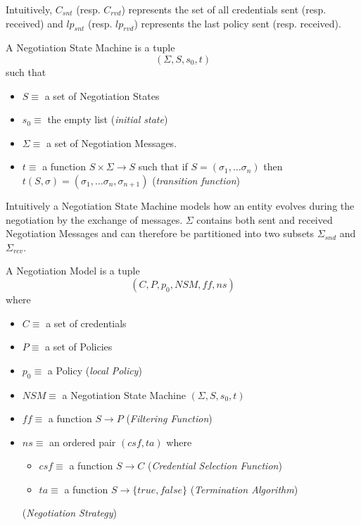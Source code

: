 \documentclass{article}
\begin{document}
Intuitively, $C_{snt}$ (resp. $C_{rvd}$) represents the set of all credentials sent (resp. received) and $lp_{snt}$ (resp. $lp_{rvd}$) represents the last policy sent (resp. received).

\begin{definition}
A Negotiation State Machine is a tuple $$(\Sigma, S, s_{0}, t)$$ such that
	\begin{itemize}
	\item $S \equiv$ a set of Negotiation States
	\item $s_{0} \equiv $ the empty list (\textit{initial state})
	\item $\Sigma \equiv $ a set of Negotiation Messages.
	\item $t \equiv $ a function $S \times \Sigma \rightarrow S$ such that if $S = (\sigma_{1}, \ldots \sigma_{n})$ then $t(S, \sigma) = (\sigma_{1},  \ldots \sigma_{n}, \sigma_{n+1})$ (\textit{transition function})
	\end{itemize}
\end{definition}

Intuitively a Negotiation State Machine models how an entity evolves during the negotiation by the exchange of messages. $\Sigma$ contains both sent and received Negotiation Messages and can therefore be partitioned into two subsets $\Sigma_{snd}$ and $\Sigma_{rcv}$.

\begin{definition}
A Negotiation Model is a tuple $$(C, P, p_{0}, NSM, ff, ns)$$ where
	\begin{itemize}
	\item $C \equiv$ a set of credentials
	\item $P \equiv$ a set of Policies
	\item $p_{0} \equiv$ a Policy (\textit{local Policy})
	\item $NSM \equiv$ a Negotiation State Machine $(\Sigma, S, s_{0}, t)$
	\item $ff \equiv$ a function $S \rightarrow P$ (\textit{Filtering Function})
	\item $ns \equiv$ an ordered pair $(csf, ta)$ where
		\begin{itemize}
		\item $csf \equiv$ a function $S \rightarrow C$ (\textit{Credential Selection Function})
		\item $ta \equiv$ a function $S \rightarrow \{true, false\}$ (\textit{Termination Algorithm})
		\end{itemize}
	(\textit{Negotiation Strategy})
	\end{itemize}
\end{definition}
\end{document}
